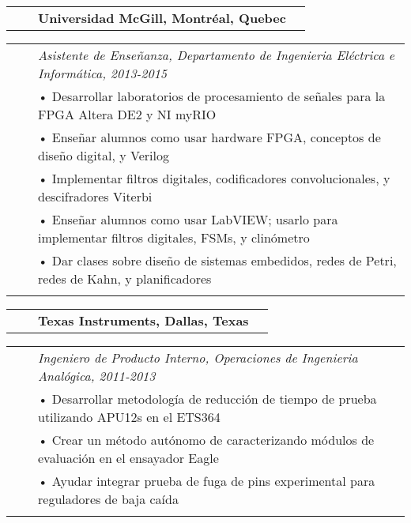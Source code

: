 \documentclass{minimal}
\begin{document}
\begin{tabular}{ p{1.5cm} p{1cm} p{10cm} >{\raggedleft\arraybackslash}p{3cm} }
& & \textbf{Universidad McGill, Montréal, Quebec} & \\
\end{tabular}

\begin{tabular}{ p{1.5cm} p{1cm} p{16cm} }
& & \textit{Asistente de Enseñanza, Departamento de Ingenieria Eléctrica e Informática, 2013-2015}\\
& & • Desarrollar laboratorios de procesamiento de señales para la FPGA Altera DE2 y NI myRIO\\
& & • Enseñar alumnos como usar hardware FPGA, conceptos de diseño digital, y Verilog\\
& & • Implementar filtros digitales, codificadores convolucionales, y descifradores Viterbi\\
& & • Enseñar alumnos como usar LabVIEW; usarlo para implementar filtros digitales, FSMs, y clinómetro\\
& & • Dar clases sobre diseño de sistemas embedidos, redes de Petri, redes de Kahn, y planificadores\\
& & \\
\end{tabular}

\pagebreak

\begin{tabular}{ p{1.5cm} p{1cm} p{10cm} >{\raggedleft\arraybackslash}p{3cm} }
& & \textbf{Texas Instruments, Dallas, Texas} & \\
\end{tabular}

\begin{tabular}{ p{1.5cm} p{1cm} p{16cm} }
& & \textit{Ingeniero de Producto Interno, Operaciones de Ingenieria Analógica, 2011-2013}\\
& & • Desarrollar metodología de reducción de tiempo de prueba utilizando APU12s en el ETS364\\
& & • Crear un método autónomo de caracterizando módulos de evaluación en el ensayador Eagle\\
& & • Ayudar integrar prueba de fuga de pins experimental para reguladores de baja caída\\
& & \\
\end{tabular}
\end{document}
